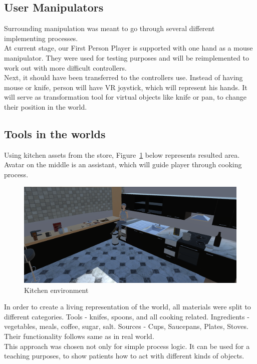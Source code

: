 \documentclass[18pt]{article}
\numberwithin{equation}{section} %
\numberwithin{figure}{section} %
\numberwithin{table}{section} %
\begin{document}
	\subsection{User Manipulators}
		Surrounding manipulation was meant to go through several different implementing processes. \\	
		At current stage, our First Person Player is supported with one hand as a mouse manipulator. They were used for testing purposes and will be reimplemented to work out with more difficult controllers. \\
		
		Next, it should have been transferred to the controllers use. Instead of having mouse or knife, person will have VR joystick, which will represent his hands. It will serve as transformation tool for virtual objects like knife or pan, to change their position in the world. \\
	
	
	
	\subsection{Tools in the worlds}
		Using kitchen assets from the store, Figure~\ref{fig:kitchen} below represents resulted area. Avatar on the middle is an assistant, which will guide player through cooking process. 
		\begin{figure}[H]
			\centering
			\includegraphics[width=0.7\linewidth]{images/kitchen}
			\caption{Kitchen environment}
			\label{fig:kitchen}
		\end{figure}
	
		In order to create a living representation of the world, all materials were split to different categories. Tools - knifes, spoons, and all cooking related. Ingredients - vegetables, meals, coffee, sugar, salt. Sources - Cups, Saucepans, Plates, Stoves. Their functionality follows same as in real world. \\
		This approach was chosen not only for simple process logic. It can be used for a teaching purposes, to show patients how to act with different kinds of objects. \\
		
\end{document}
